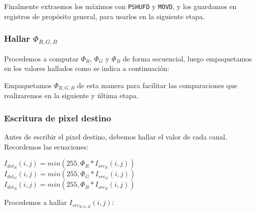 Finalmente extraemos los máximos con \texttt{PSHUFD} y \texttt{MOVD},
y los guardamos en registros de propósito general, para usarlos en la
siguiente etapa.




\subsubsection{Hallar $\Phi_{R,G,B}$}

Procedemos a computar $\Phi_R$, $\Phi_G$ y $\Phi_B$ de forma secuencial,
luego empaquetamos en  los valores hallados como se indica a continuación:

\begin{center}
\end{center}

Empaquetamos $\Phi_{R,G,B}$ de esta manera para facilitar las
comparaciones que realizaremos en la siguiente y última etapa.




\subsubsection{Escritura de pixel destino}

Antes de escribir el pixel destino, debemos hallar el valor de cada canal.
Recordemos las ecuaciones:

\begin{center}
    $I_{dst_R}(i, j) = min(255, \Phi_R \ast I_{src_R}(i, j))$ \\
    $I_{dst_G}(i, j) = min(255, \Phi_G \ast I_{src_G}(i, j))$ \\
    $I_{dst_B}(i, j) = min(255, \Phi_B \ast I_{src_B}(i, j))$
\end{center}

Procedemos a hallar $I_{src_{R,G,B}}(i, j)$:

